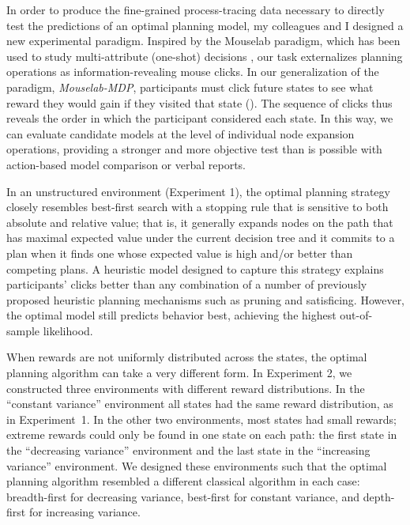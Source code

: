 \documentclass[11pt,a4paperpaper,]{article}
\begin{document}
In order to produce the fine-grained process-tracing data necessary to directly test the predictions of an optimal planning model, my colleagues and I designed a new experimental paradigm. Inspired by the Mouselab paradigm, which has been used to study multi-attribute (one-shot) decisions \citep{payne1988adaptive}, our task externalizes planning operations as information-revealing mouse clicks. In our generalization of the paradigm, \emph{Mouselab-MDP}, participants must click future states to see what reward they would gain if they visited that state (). The sequence of clicks thus reveals the order in which the participant considered each state. In this way, we can evaluate candidate models at the level of individual node expansion operations, providing a stronger and more objective test than is possible with action-based model comparison or verbal reports.

In an unstructured environment (Experiment 1), the optimal planning strategy closely resembles best-first search with a stopping rule that is sensitive to both absolute and relative value; that is, it generally expands nodes on the path that has maximal expected value under the current decision tree and it commits to a plan when it finds one whose expected value is high and/or better than competing plans. A heuristic model designed to capture this strategy explains participants' clicks better than any combination of a number of previously proposed heuristic planning mechanisms such as pruning and satisficing. However, the optimal model still predicts behavior best, achieving the highest out-of-sample likelihood.

When rewards are not uniformly distributed across the states, the optimal planning algorithm can take a very different form. In Experiment 2, we constructed three environments with different reward distributions. In the ``constant variance'' environment all states had the same reward distribution, as in Experiment~1. In the other two environments, most states had small rewards; extreme rewards could only be found in one state on each path: the first state in the ``decreasing variance'' environment and the last state in the ``increasing variance'' environment. We designed these environments such that the optimal planning algorithm resembled a different classical algorithm in each case: breadth-first for decreasing variance, best-first for constant variance, and depth-first for increasing variance. 
\end{document}
